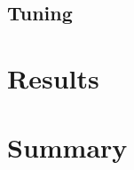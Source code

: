 \documentclass[twoside,11pt]{article}
\begin{document}
\subsection{Tuning}

\section{Results}

\section{Summary}

\newpage


\end{document}
